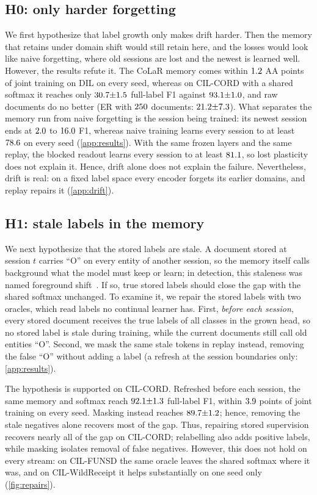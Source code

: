 \documentclass[10pt,twocolumn,letterpaper]{article}
\begin{document}
\subsection{H0: only harder forgetting}
\label{sec:h0}
We first hypothesize that label growth only makes drift harder. Then the memory that retains under domain shift would still retain here, and the losses would look like naive forgetting, where old sessions are lost and the newest is learned well. However, the results refute it. The CoLaR memory comes within $1.2$ AA points of joint training on DIL on every seed, whereas on CIL-CORD with a shared softmax it reaches only $30.7{\pm}1.5$ full-label F1 against $93.1{\pm}1.0$, and raw documents do no better (ER with $250$ documents: $21.2{\pm}7.3$). What separates the memory run from naive forgetting is the session being trained: its newest session ends at $2.0$ to $16.0$ F1, whereas naive training learns every session to at least $78.6$ on every seed (\cref{app:results}). With the same frozen layers and the same replay, the blocked readout learns every session to at least $81.1$, so lost plasticity does not explain it. Hence, drift alone does not explain the failure. Nevertheless, drift is real: on a fixed label space every encoder forgets its earlier domains, and replay repairs it (\cref{app:drift}).

\subsection{H1: stale labels in the memory}
\label{sec:h1}
We next hypothesize that the stored labels are stale. A document stored at session $t$ carries ``O'' on every entity of another session, so the memory itself calls background what the model must keep or learn; in detection, this staleness was named foreground shift~\citep{liu2023abr}. If so, true stored labels should close the gap with the shared softmax unchanged. To examine it, we repair the stored labels with two oracles, which read labels no continual learner has. First, \emph{before each session}, every stored document receives the true labels of all classes in the grown head, so no stored label is stale during training, while the current documents still call old entities ``O''. Second, we mask the same stale tokens in replay instead, removing the false ``O'' without adding a label (a refresh at the session boundaries only: \cref{app:results}).

The hypothesis is supported on CIL-CORD. Refreshed before each session, the same memory and softmax reach $92.1{\pm}1.3$ full-label F1, within $3.9$ points of joint training on every seed. Masking instead reaches $89.7{\pm}1.2$; hence, removing the stale negatives alone recovers most of the gap. Thus, repairing stored supervision recovers nearly all of the gap on CIL-CORD; relabelling also adds positive labels, while masking isolates removal of false negatives. However, this does not hold on every stream: on CIL-FUNSD the same oracle leaves the shared softmax where it was, and on CIL-WildReceipt it helps substantially on one seed only (\cref{fig:repairs}).
\end{document}
